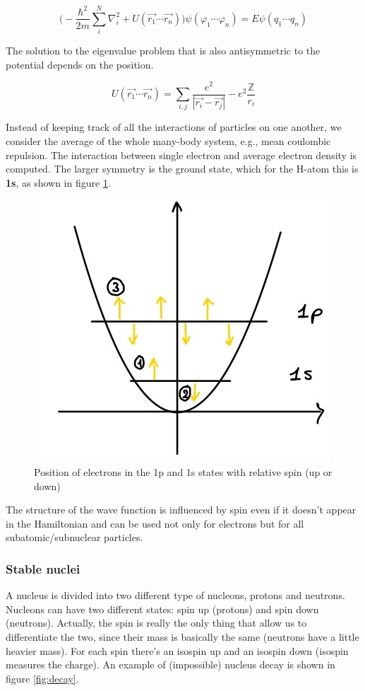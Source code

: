 	$$\bigg(-\frac{\hbar^2}{2m}\sum_{i}^{N}\nabla^2_i+U(\vec{r_1}\cdots\vec{r_n})\bigg)\psi(\varphi_1 \cdots\varphi_n)=E\psi(q_1 \cdots q_n)$$

	The solution to the eigenvalue problem that is also antisymmetric to the potential depends on the position.

	$$U(\vec{r_1}\cdots\vec{r_n})=\sum_{i,j}\frac{e^2}{|\vec{r_i}-\vec{r_j}|}-e^2\frac{\mathbb{Z}}{r_i}$$

	Instead of keeping track of all the interactions of particles on one another, we consider the average of the whole many-body system, e.g., mean coulombic repulsion.
	The interaction between single electron and average electron density is computed.
	The larger symmetry is the ground state, which for the H-atom this is \textbf{1s}, as shown in figure \ref{fig:spin1}.

	\begin{figure}[htbp!]
 		\centering
 		\includegraphics[scale=0.20]{img_6}
 		\caption{Position of electrons in the 1p and 1s states with relative spin (up or down)}
 		\label{fig:spin1}
	\end{figure}

	The structure of the wave function is influenced by spin even if it doesn't appear in the Hamiltonian and can be used not only for electrons but for all subatomic/subnuclear particles.

		\subsubsection{Stable nuclei}
		A nucleus is divided into two different type of nucleons, protons and neutrons.
		Nucleons can have two different states: spin up (protons) and spin down (neutrons).
		Actually, the spin is really the only thing that allow us to differentiate the two, since their mass is basically the same (neutrons have a little heavier mass).
		For each spin there's an isospin up and an isospin down (isospin measures the charge).
		An example of (impossible) nucleus decay is shown in figure \ref{fig:decay}.

